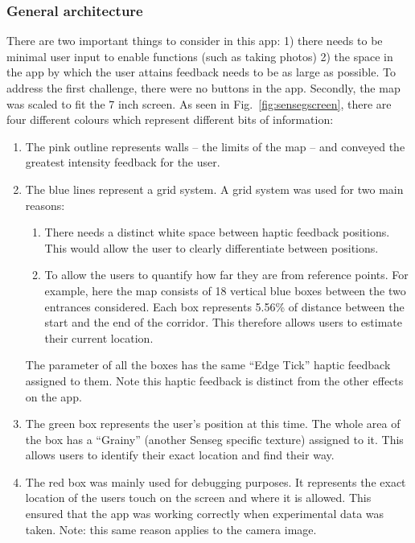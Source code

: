 \subsubsection{General architecture} 
There are two important things to consider in this app: 1) there needs to be minimal user input to enable functions (such as taking photos) 2) the space in the app by which the user attains feedback needs to be as large as possible. To address the first challenge, there were no buttons in the app. Secondly, the map was scaled to fit the 7 inch screen.  As seen in Fig.~\ref{fig:sensegscreen}, there are four different colours which represent different bits of information:


\begin{enumerate}
  \item The pink outline represents walls -- the limits of the map -- and conveyed the greatest intensity feedback for the user.
  \item The blue lines represent a grid system. A grid system was used for two main reasons:
  \begin{enumerate}
  \item There needs a distinct white space between haptic feedback positions. This would allow the user to clearly differentiate between positions.
  \item To allow the users to quantify how far they are from reference points. For example, here the map consists of 18 vertical blue boxes between the two entrances considered. Each box represents  5.56\% of distance between the start and the end of the corridor. This therefore allows users to estimate their current location.
  \end{enumerate}
  The parameter of all the boxes has the same ``Edge Tick'' haptic feedback assigned to them. Note this haptic feedback is distinct from the other effects on the app.
  \item The green box represents the user's position at this time. The whole area of the box has a ``Grainy'' (another Senseg specific texture) assigned to it. This allows users to identify their exact location and find their way.
  \item The red box was mainly used for debugging purposes. It represents the exact location of the users touch on the screen and where it is allowed. This ensured that the app was working correctly when experimental data was taken. Note: this same reason applies to the camera image.
\end{enumerate} 


